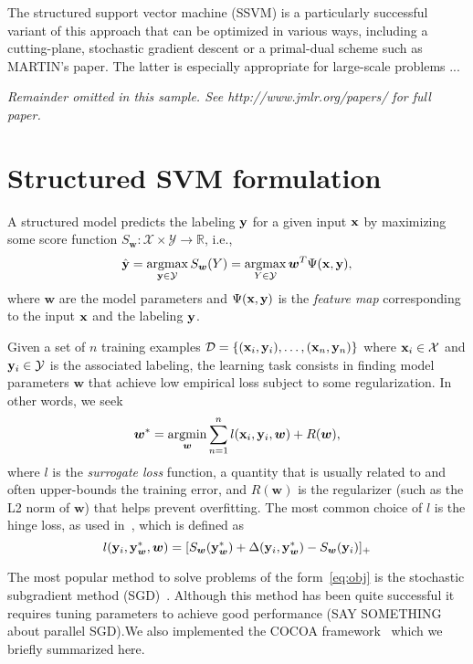 \documentclass[twoside,11pt]{article}
\newcommand{\dataset}{{\cal D}}
\newcommand{\xv}{{\bf x}}
\newcommand{\yv}{{\bf y}}
\newcommand{\argmax}{\operatornamewithlimits{argmax}}
\newcommand{\argmin}{\operatornamewithlimits{argmin}}
\newcommand{\0}{\mathbf{0}} %
\newcommand{\weight}{w}
\newcommand{\wv}{{\bm{\weight}}}
\begin{document}
The structured support vector machine (SSVM) is a particularly successful variant of this approach that can be optimized in various ways, including a cutting-plane, stochastic gradient descent or a primal-dual scheme such as MARTIN's paper. The latter is especially appropriate for large-scale problems ...

{\noindent \em Remainder omitted in this sample. See http://www.jmlr.org/papers/ for full paper.}

\section{Structured SVM formulation}

A structured model predicts the labeling $\yv$ for a given input $\xv$ by maximizing some score function
$S_\wv:\mathcal{X} \times \mathcal{Y} \rightarrow \mathbb{R}$,
i.e.,
%
\begin{equation}
\label{eq:inference}
\hat{\yv} = \argmax_{\yv \in \mathcal{Y}} S_\wv(Y) = \argmax_{Y \in \mathcal{Y}} \wv^T\Psi(\xv,\yv),
\end{equation}
%
where $\wv$ are the model parameters and $\Psi(\xv,\yv)$ is the \emph{feature map} corresponding to the input $\xv$ and the labeling $\yv$.


Given a set of $n$ training examples $\dataset=\{(\xv_i,\yv_i), \dots, (\xv_n, \yv_n)\}$ where $\xv_i \in \mathcal{X}$ and $\yv_i \in \mathcal{Y}$ is the associated labeling, 
the learning task consists in finding model parameters $\wv$ that achieve low empirical loss subject to some regularization. In other words, we seek
%
\begin{align}
\label{eq:obj}
\wv^* = \argmin_{\wv} \sum_{n=1}^n l(\xv_i, \yv_i, \wv) + R(\wv),
\end{align}
%
where $l$ is the \emph{surrogate loss} function,
a quantity that is usually related to and often upper-bounds the training error, 
and $R(\wv)$ is the regularizer (such as the L2 norm of $\wv$)
that helps prevent overfitting. 
The most common choice of $l$ is the hinge loss, as used in~\cite{Taskar:2003tt,Tsochantaridis:2005ww}, which is defined as
\begin{equation}
\label{eq:hinge-loss}
l(\yv_i, \yv^*_\wv, \wv) = [S_\wv(\yv^*_\wv) + \Delta(\yv_i, \yv^*_\wv) - S_\wv(\yv_i)]_+
\end{equation}


The most popular method to solve problems of the form~\eqref{eq:obj}
is the stochastic subgradient method (SGD)~\citep{Ratliff:2007ti,ShalevShwartz:2010cg}. Although this method has
been quite successful it requires tuning parameters to achieve good
performance (SAY SOMETHING about parallel SGD).We also implemented the
COCOA framework~\cite{Jaggi:2014vi} which we briefly summarized here.
\end{document}
